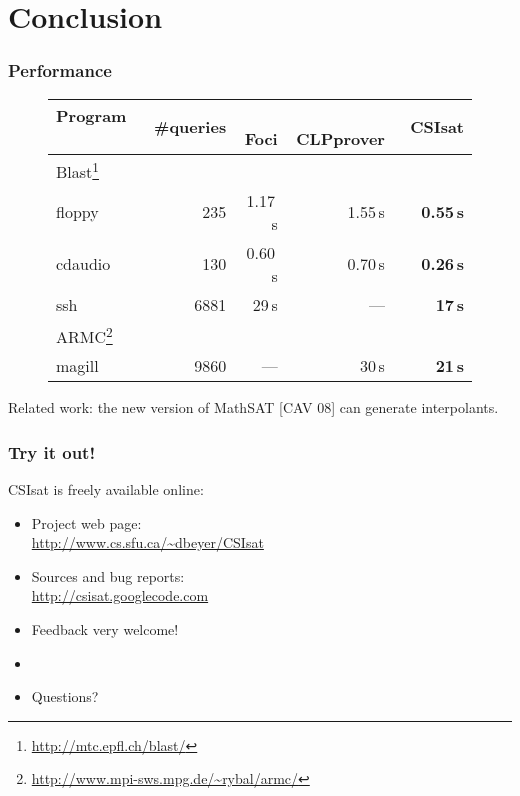 \documentclass{beamer}
\newcommand{\csisat}{{\sc CSIsat}}
\newcommand{\blast}{{\sc Blast}}
\newcommand{\armc}{{\sc ARMC}}
\newcommand{\mathsat}{{\sc MathSAT}}
\newcommand{\clpprover}{{\sc CLPprover}}
\newcommand{\foci}{{\sc Foci}}
\begin{document}
\section*{Conclusion}
\begin{frame}
  \frametitle{Performance}
  
\begin{figure}
{\footnotesize
\centering
\begin{tabular}{|l|rrrr|}
  \hline
  Program ~~~~~~~ &   \#queries  & ~ \foci{} & ~ \clpprover{}  & \textbf{~\csisat{}}     \\
  \hline
  \hline
  \blast{}\footnote{\url{http://mtc.epfl.ch/blast/}} & & & & \\
  floppy              &   235        & 1.17\,s    &  1.55\,s         & \textbf{0.55\,s}        \\
  cdaudio             &   130        & 0.60\,s    &  0.70\,s         & \textbf{0.26\,s}         \\
  ssh                 &  6881        & 29\,s      & ---              & \textbf{17\,s}         \\
  \hline
  \armc{}\footnote{\url{http://www.mpi-sws.mpg.de/~rybal/armc/}} & & & & \\
  magill      &  9860        & ---        & 30\,s            & \textbf{21\,s}         \\
  \hline
\end{tabular}
}
\end{figure}

\vspace{1cm}
{\footnotesize
Related work: the new version of \mathsat{} [CAV 08] can generate interpolants.
}

\end{frame}

\begin{frame}
  \frametitle{Try it out! }
  \csisat{} is freely available online:
  \begin{itemize}
    \item Project web page:\\ 
          \url{http://www.cs.sfu.ca/~dbeyer/CSIsat}
    \item Sources and bug reports:\\ 
          \url{http://csisat.googlecode.com}
    \item Feedback very welcome!
    \item[]
    \item Questions?
  \end{itemize}
\end{frame}
%
%
\end{document}
